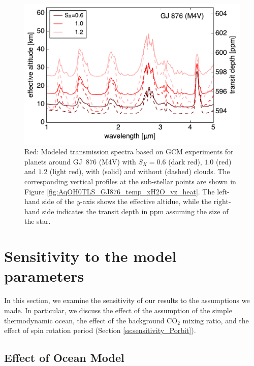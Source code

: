 \documentclass[11pt,numberedappendix,twocolappendix,]{emulateapj}
\begin{document}
\begin{figure}[!h]
    \begin{center}
    \includegraphics[width=\hsize]{fig/transit_GJ876.pdf}
    \end{center}
\caption{Red: Modeled transmission spectra based on GCM experiments for planets around GJ~876 (M4V) with $S_X=0.6$ (dark red), $1.0$ (red) and $1.2$ (light red), with (solid) and without (dashed) clouds. The corresponding vertical profiles at the sub-stellar points are shown in Figure \ref{fig:AqOH0TLS_GJ876_temp_xH2O_vz_heat}. The left-hand side of the $y$-axis shows the effective altidue, while the right-hand side indicates the transit depth in ppm assuming the size of the star. }
\label{fig:transmission}
\end{figure}


\section{Sensitivity to the model parameters}
\label{s:sensitivity}

In this section, we examine the sensitivity of our results to the  assumptions we made. 
In particular, we discuss the effect of the assumption of the simple thermodynamic ocean, the effect of the background CO$_2$ mixing ratio, and the effect of spin rotation period (Section \ref{ss:sensitivity_Porbit}). 



\subsection{Effect of Ocean Model}
\label{ss:sensitivity_ocean}
\end{document}
